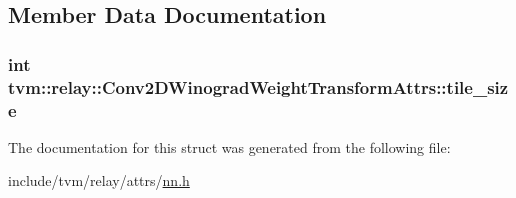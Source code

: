 \subsection{Member Data Documentation}
\subsubsection[{\texorpdfstring{tile\+\_\+size}{tile_size}}]{\setlength{\rightskip}{0pt plus 5cm}int tvm\+::relay\+::\+Conv2\+D\+Winograd\+Weight\+Transform\+Attrs\+::tile\+\_\+size}\hypertarget{structtvm_1_1relay_1_1Conv2DWinogradWeightTransformAttrs_adede97fe87745802006e80503a739ac0}{}\label{structtvm_1_1relay_1_1Conv2DWinogradWeightTransformAttrs_adede97fe87745802006e80503a739ac0}


The documentation for this struct was generated from the following file\+:\begin{DoxyCompactItemize}
\item 
include/tvm/relay/attrs/\hyperlink{include_2tvm_2relay_2attrs_2nn_8h}{nn.\+h}\end{DoxyCompactItemize}
